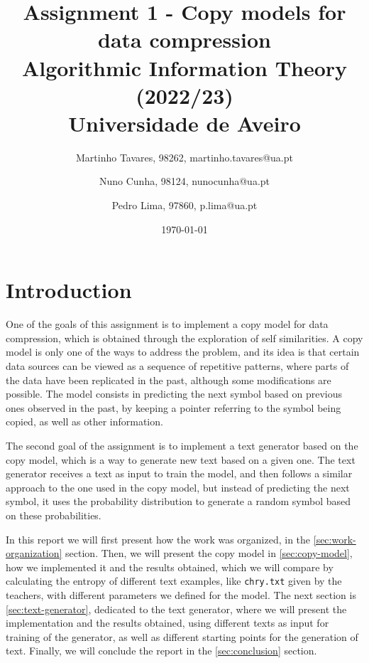 \documentclass{article}
\begin{document}
\title{
    Assignment 1 - Copy models for data compression \\
    \large{Algorithmic Information Theory (2022/23) \\
    Universidade de Aveiro}
}

\author{
    Martinho Tavares, 98262, martinho.tavares@ua.pt \and
    Nuno Cunha, 98124, nunocunha@ua.pt \and
    Pedro Lima, 97860, p.lima@ua.pt
}

\date{\today}
\maketitle

\section{Introduction}

One of the goals of this assignment is to implement a copy model for data compression, which is obtained through the exploration of self similarities.
A copy model is only one of the ways to address the problem, and its idea is that certain data sources can be viewed as a sequence of repetitive patterns,
where parts of the data have been replicated in the past, although some modifications are possible. 
The model consists in predicting the next symbol based on previous ones observed in the past, by keeping a pointer referring to the symbol being copied, as well as other information.

The second goal of the assignment is to implement a text generator based on the copy model, which is a way to generate new text based on a given one.
The text generator receives a text as input to train the model, and then follows a similar approach to the one used in the copy model,
but instead of predicting the next symbol, it uses the probability distribution to generate a random symbol based on these probabilities.

In this report we will first present how the work was organized, in the \ref{sec:work-organization} section.
Then, we will present the copy model in \ref{sec:copy-model}, how we implemented it and the results obtained, which we will compare by calculating the entropy of different text examples,
like \verb|chry.txt| given by the teachers, with different parameters we defined for the model.
The next section is \ref{sec:text-generator}, dedicated to the text generator, where we will present the implementation and the results obtained,
using different texts as input for training of the generator, as well as different starting points for the generation of text.
Finally, we will conclude the report in the \ref{sec:conclusion} section.
\end{document}
